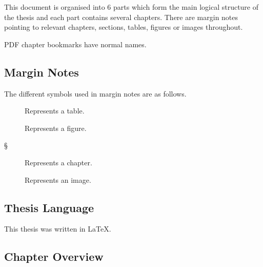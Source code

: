 %   

% 


This document is organised into \num{6} parts which form the main logical structure of the thesis and each part contains several chapters. There are margin notes pointing to relevant chapters, sections, tables, figures or images throughout.

PDF chapter bookmarks have normal names.

\subsection{Margin Notes}

The different symbols used in margin notes are as follows.

\begin{description}
  \item [] Represents a table.
  \item [] Represents a figure.
  \item [§] Represents a chapter.
  \item [] Represents an image.
\end{description}



\subsection{Thesis Language}

This thesis was written in \LaTeX.


\subsection{Chapter Overview}

